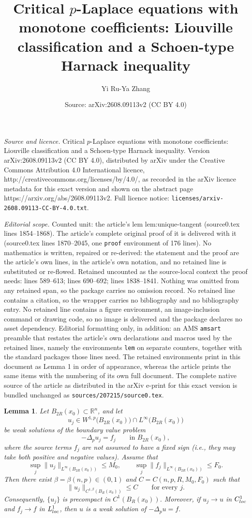 \documentclass[10pt,a4paper]{amsart}
\title{Critical $p$-Laplace equations with monotone coefficients: Liouville classification and a Schoen-type Harnack inequality}
\author{Yi Ru-Ya Zhang}
\date{Source: arXiv:2608.09113v2 (CC BY 4.0)}
\newtheorem{lem}{Lemma}
\begin{document}
\maketitle

\noindent\emph{Source and licence.} Critical $p$-Laplace equations with monotone coefficients: Liouville classification and a Schoen-type Harnack inequality. Version arXiv:2608.09113v2 (CC BY 4.0), distributed by arXiv under the Creative Commons Attribution 4.0 International licence, http://creativecommons.org/licenses/by/4.0/, as recorded in the arXiv licence metadata for this exact version and shown on the abstract page https://arxiv.org/abs/2608.09113v2. Full licence notice: \texttt{licenses/arxiv-2608.09113-CC-BY-4.0.txt}.\par\smallskip

\noindent\textit{Editorial scope.} Counted unit: the article's lem lem:unique-tangent (source0.tex lines 1854--1868). The article's complete original proof of it is delivered with it (source0.tex lines 1870--2045, one \texttt{proof} environment of 176 lines). No mathematics is written, repaired or re-derived: the statement and the proof are the article's own lines, in the article's own notation, and no retained line is substituted or re-flowed.  Retained uncounted as the source-local context the proof needs: lines 589--613; lines 690--692; lines 1838--1841.  Nothing was omitted from any retained span, so the package carries no omission record.  No retained line contains a citation, so the wrapper carries no bibliography and no bibliography entry.  No retained line contains a figure environment, an image-inclusion command or drawing code, so no image is delivered and the package declares no asset dependency.  Editorial formatting only, in addition: an AMS \texttt{amsart} preamble that restates the article's own declarations and macros used by the retained lines, namely the environments \texttt{lem} on separate counters, together with the standard packages those lines need.  The retained environments print in this document as Lemma 1 in order of appearance, whereas the article prints the same items with the numbering of its own full document.  The complete native source of the article as distributed in the arXiv e-print for this exact version is bundled unchanged as \texttt{sources/207215/source0.tex}.
\begin{lem}
\label{lem:uniform-C1-compactness}
Let $B_{2R}(x_0)\subset\mathbb{R}^n$, and let
$$
u_j \in W^{1,p}\bigl(B_{2R}(x_0)\bigr)\cap L^\infty\bigl(B_{2R}(x_0)\bigr)
$$
be weak solutions of the boundary value problem
$$
-\Delta_p u_j = f_j \qquad \text{in } B_{2R}(x_0),
$$
where the source terms $f_j$ are not assumed to have a fixed sign (i.e., they may take both positive and negative values). Assume that
$$
\sup_j\|u_j\|_{L^\infty(B_{2R}(x_0))}\le M_0,
\qquad \sup_j\|f_j\|_{L^\infty(B_{2R}(x_0))}\le F_0.
$$
Then there exist $\beta=\beta(n,p)\in(0,1)$ and
$C=C(n,p,R,M_0,F_0)$ such that
$$
\|u_j\|_{C^{1,\beta}(B_R(x_0))}\le C \qquad\text{for every }j.
$$
Consequently, $\{u_j\}$ is precompact in $C^1(B_R(x_0))$.
Moreover, if $u_j\to u$ in $C^1_{\rm loc}$ and
$f_j\to f$ in $L^1_{\rm loc}$, then $u$ is a weak solution of
$-\Delta_pu=f$.
\end{lem}
\end{document}

